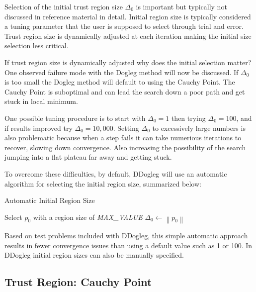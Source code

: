 \documentclass[peerreview,onecolumn]{IEEEtran}
\newcommand{\norm}[1]{\left\lVert#1\right\rVert}
\begin{document}
Selection of the initial trust region size $\Delta_0$ is important but typically not discussed in reference material \cite{fletcher1987,numopt2006,IMM2004} in detail. Initial region size is typically considered a tuning parameter that the user is supposed to select through trial and error. Trust region size is dynamically adjusted at each iteration making the initial size selection less critical. 

If trust region size is dynamically adjusted why does the initial selection matter? One observed failure mode with the Dogleg method will now be discussed. If $\Delta_0$ is too small the Dogleg method will default to using the Cauchy Point. The Cauchy Point is suboptimal and can lead the search down a poor path and get stuck in local minimum. 

One possible tuning procedure is to start with $\Delta_0=1$ then trying $\Delta_0=100$, and if results improved try $\Delta_0=10,000$. Setting $\Delta_0$ to excessively large numbers is also problematic because when a step fails it can take numerious iterations to recover, slowing down convergence. Also increasing the possibility of the search jumping into a flat plateau far away and getting stuck. 

To overcome these difficulties, by default, DDogleg will use an automatic algorithm for selecting the initial region size, summarized below:
\begin{algorithm}{}
\caption{\label{alg:initial_region}Automatic Initial Region Size}
\begin{algorithmic}[1]
	\State Select $p_0$ with a region size of \textit{MAX\_VALUE}
	\State $\Delta_0 \gets \norm{p_0}$ 
\end{algorithmic}
\end{algorithm}
Based on test problems included with DDogleg, this simple automatic approach results in fewer convergence issues than using a default value such as 1 or 100. In DDogleg initial region sizes can also be manually specified.

\subsection{Trust Region: Cauchy Point}
\label{section:cauchy} 
\end{document}
